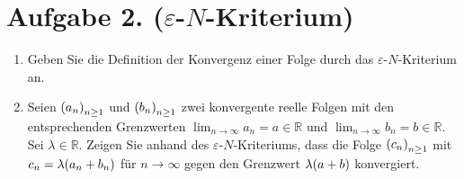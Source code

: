 \documentclass[german,12pt]{homework}
\newcommand{\RR}{\mathbb{R}}
\DeclarePairedDelimiter{\enbrace}{(}{)}
\begin{document}
    \section*{Aufgabe 2. (\(\varepsilon\)-\(N\)-Kriterium)}

    \begin{problem}
        \begin{enumerate}
            \item Geben Sie die Definition der Konvergenz einer Folge durch das
            \(\varepsilon\)-\(N\)-Kriterium an.
            \item Seien \(\enbrace*{a_n}_{n \ge 1}\) und \(\enbrace*{b_n}_{n
            \ge 1}\) zwei konvergente reelle Folgen mit den entsprechenden
            Grenzwerten \(\lim_{n \to \infty}a_n = a \in \RR\) und \(\lim_{n
            \to \infty}b_n = b \in \RR\). Sei \(\lambda \in \RR\). Zeigen Sie
            anhand des \(\varepsilon\)-\(N\)-Kriteriums, dass die Folge
            \(\enbrace*{c_n}_{n \ge 1}\) mit \(c_n = \lambda\enbrace*{a_n +
            b_n}\) für \(n \to \infty\) gegen den Grenzwert
            \(\lambda\enbrace*{a + b}\) konvergiert.
        \end{enumerate}
    \end{problem}
\end{document}

